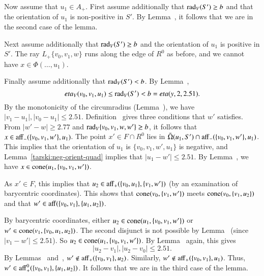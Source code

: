 \begin{tarskidata}
\begin{tarski}
\begin{proved}

Now assume that $u_1\in A_+$.
First assume additionally that
$\operatorname{rad}_V(S')\ge b$ and that
the orientation of $u_1$ is non-positive in $S'$.  By Lemma~, it
follows that we are in the second case of the lemma.  

Next assume additionally that
$\operatorname{rad}_V(S')\ge b$ and the orientation of $u_1$ is positive
in $S'$.  The ray $L_+\{v_0,v_1,w\}$ runs along the edge of 
$R^0$ as before, and we cannot have $x\in\Phi(\ldots,u_1)$.

Finally assume additionally that $\operatorname{rad}_V(S')<b$.  By Lemma~,
$$
eta_V(v_0,v_1,u_1)\le \operatorname{rad}_V(S') < b = eta(y,2,2.51).
$$
By the monotonicity of the circumradius (Lemma~), we have $|v_1-u_1|,|v_0-u_1|\le 2.51$.
Definition~ gives three conditions that $w'$ satisfies.
From $|w'-w|\ge 2.77$ and $\operatorname{rad}_V\{v_0,v_1,w,w'\} \ge b$,
it follows that $x\in {\operatorname{aff}}_-(\{v_0,v_1,w'\},u_1)$.  
The point $x'\in F\cap R^0$ lies in $\bar\Omega(u_1,S') \cap {\operatorname{aff}}_-(\{v_0,v_1,w'\},u_1)$.
This implies that the orientation of $u_1$ is $\{v_0,v_1,w',u_1\}$ is negative, and Lemma~\ref{tarski:neg-orient-quad}
implies that $|u_1-w'|\le 2.51$.
By Lemma~, we have $x\in{\operatorname{cone}}(u_1,\{v_0,v_1,w'\})$.

As $x'\in F$, this implies that $u_2\in{\operatorname{aff}}_+(\{v_0,u_1\},\{v_1,w'\})$ (by an examination of
barycentric coordinates).  This shows that ${\operatorname{cone}}(v_0,\{v_1,w'\})$ meets ${\operatorname{cone}}(v_0,\{v_1,u_2\})$ and
that $w'\in {\operatorname{aff}}(\{v_0,v_1\},\{u_1,u_2\})$.

By barycentric coordinates, either $u_2\in{\operatorname{cone}}(u_1,\{v_0,v_1,w'\})$ or $w'\in{\operatorname{cone}}(v_1,\{v_0,u_1,u_2\})$.
The second disjunct is not possible by Lemma~ (since $|v_1-w'|\le 2.51$).
So $u_2\in{\operatorname{cone}}(u_1,\{v_0,v_1,w'\})$.  By Lemma~ again, this gives 
  $$
  |u_2-v_1|, |u_2-v_0|\le 2.51.
  $$
By Lemmas~ and~, $w'\not\in{\operatorname{aff}}_+(\{v_0,v_1\},u_2)$.
Similarly, $w'\not\in{\operatorname{aff}}_+(\{v_0,v_1\},u_1)$.  Thus, $w'\in{\operatorname{aff}}_+^0(\{v_0,v_1\},\{u_1,u_2\})$.
It follows that we are in the third case of the lemma.
\swallowed\end{proved}
\end{tarski}






\end{tarskidata}

